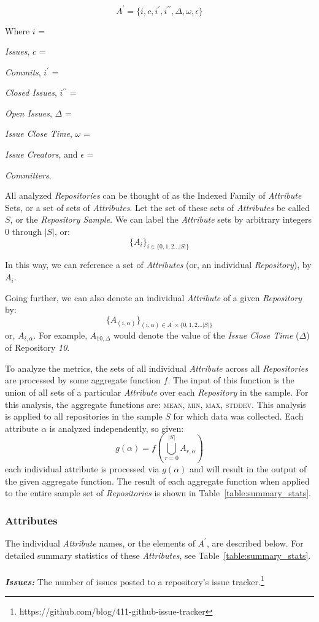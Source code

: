 \documentclass{proc}
\begin{document}
\[A^\prime = \{i, c, i^\prime, i^{\prime\prime}, \Delta, \omega, \epsilon\}\]

Where $i$ = {\textit{Issues}, $c$ = {\textit{Commits}, $i^\prime$ = {\textit{Closed Issues}, $i^{\prime\prime}$ = {\textit{Open Issues}, $\Delta$ = {\textit{Issue Close Time}, $\omega$ = {\textit{Issue Creators}, and $\epsilon$ = {\textit{Committers}.

All analyzed \textit{Repositories} can be thought of as the Indexed Family of \textit{Attribute} Sets, or a set of sets of \textit{Attributes}. Let the set of these sets of \textit{Attributes} be called $S$, or the \textit{Repository Sample}. We can label the \textit{Attribute} sets by arbitrary integers 0 through $|S|$, or:
\[ \{A_i\}_{i \in \{0,1,2 ... |S|\} }\]

In this way, we can reference a set of \textit{Attributes} (or, an individual \textit{Repository}), by $A_i$. 

Going further, we can also denote an individual \textit{Attribute} of a given \textit{Repository} by:
\[ \{A_{(i,\alpha)}\}_{(i,\alpha) \in A^\prime \times \{0,1,2 ... |S|\} } \]
or, $A_{i,\alpha}$. For example, $A_{10,\Delta}$ would denote the value of the \textit{Issue Close Time} ($\Delta$) of Repository \textit{10}.

To analyze the metrics, the sets of all individual \textit{Attribute} across all \textit{Repositories} are processed by some aggregate function $f$. The input of this function is the union of all sets of a particular \textit{Attribute} over each \textit{Repository} in the sample. For this analysis, the aggregate functions are: \textsc{mean}, \textsc{min}, \textsc{max}, \textsc{stddev}. This analysis is applied to all repositories in the sample $S$ for which data was collected. Each attribute $\alpha$ is analyzed independently, so given:
\[ g(\alpha) =f \left( \bigcup\limits_{r = 0}^{|S|}  A_{r,\alpha} \right) \]
each individual attribute is processed via $g(\alpha)$ and will result in the output of the given aggregate function. The result of each aggregate function when applied to the entire sample set of \textit{Repositories} is shown in Table~\ref{table:summary_stats}.

\subsubsection{Attributes}
\label{sec:attributes}
The individual \textit{Attribute} names, or the elements of $A^\prime$, are described below. For detailed summary statistics of these \textit{Attributes}, see Table~\ref{table:summary_stats}.\\\\
\noindent \textbf{\textit{Issues:}}
The number of issues posted to a repository's issue tracker.\footnote{https://github.com/blog/411-github-issue-tracker}

}}}}}}}
\end{document}
